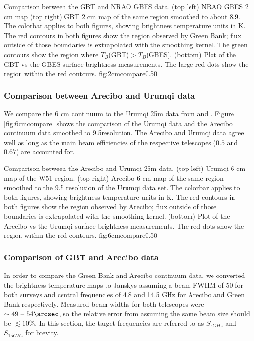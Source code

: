 {Comparison between the GBT and NRAO GBES \citep{Langston2000a} data.
(top left) NRAO GBES 2 cm map
(top right) GBT 2 cm map of the same region smoothed to about 8.9\arcmin. 
The colorbar applies to both figures,
showing brightness temperature units in K.  The red contours in both figures
show the region observed by Green Bank; flux outside of those boundaries is
extrapolated with the smoothing kernel.  The green contours show the region
where $T_B$(GBT)$>T_B$(GBES).  (bottom) Plot of the GBT vs the GBES surface
brightness measurements.
The large red dots show the region within the red contours.  
}
{fig:2cmcompare}{0.5}{0}

\subsubsection{Comparison between Arecibo and Urumqi data}
We compare the 6 cm continuum to the Urumqi 25m data from \citet{Sun2007a} and
\citet{Sun2011a}.  Figure \ref{fig:6cmcompare} shows the comparison of the
Urumqi data and the Arecibo continuum data smoothed to 9.5\arcmin resolution.
The Arecibo and Urumqi data agree well as long as the main beam
efficiencies of the respective telescopes ($0.5$ and $0.67$) are accounted for.


{Comparison between the Arecibo and Urumqi 25m \citep{Sun2011b} data.
(top left) Urumqi 6 cm map of the W51 region.
(top right) Arecibo 6 cm map of the same region smoothed to the 9.5\arcmin
resolution of the Urumqi data set.  The colorbar applies to both figures,
showing brightness temperature units in K.  The red contours in both figures
show the region observed by Arecibo; flux outside of those boundaries is
extrapolated with the smoothing kernel. 
(bottom) Plot of the Arecibo vs the Urumqi surface brightness measurements.
The red dots show the region within the red contours.
}
{fig:6cmcompare}{0.5}{0}


\subsubsection{Comparison of GBT and Arecibo data}
In order to compare the Green Bank and Arecibo continuum data, we converted
the brightness temperature maps to Janskys assuming a beam FWHM of 50\arcsec
for both surveys and central frequencies of 4.8 and 14.5 GHz for Arecibo and
Green Bank respectively.  Measured beam widths for both telescopes were
$\sim49-54\arcsec$, so the relative error from assuming the same beam size
should be $\lesssim10\%$.
In this section, the target frequencies are referred
to as $S_{5 GHz}$ and $S_{15 GHz}$ for brevity.

